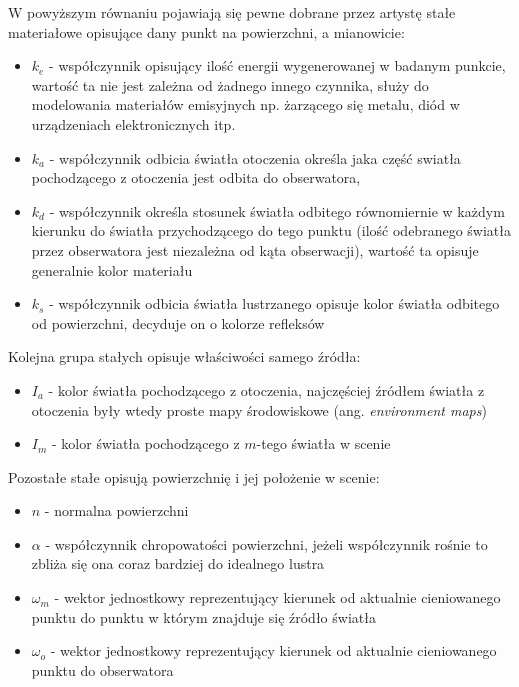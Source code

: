 \documentclass[../main.tex]{subfiles}
\begin{document}
W powyższym równaniu pojawiają się pewne dobrane przez artystę stałe materiałowe opisujące dany punkt na powierzchni, a mianowicie:

\begin{itemize}

\item $k_e$ - współczynnik opisujący ilość energii wygenerowanej w badanym punkcie, wartość ta nie jest zależna od żadnego innego czynnika, służy do modelowania materiałów emisyjnych np. żarzącego się metalu, diód w urządzeniach elektronicznych itp.

\item $k_a$ - współczynnik odbicia światła otoczenia określa jaka część swiatła pochodzącego z otoczenia jest odbita do obserwatora, 

\item $k_d$ - współczynnik określa stosunek światła odbitego równomiernie w każdym kierunku do światła przychodzącego do tego punktu (ilość odebranego światła przez obserwatora jest niezależna od kąta obserwacji), wartość ta opisuje generalnie kolor materiału

\item $k_s$ - współczynnik odbicia światła lustrzanego opisuje kolor światła odbitego od powierzchni, decyduje on o kolorze refleksów

\end{itemize}

\noindent Kolejna grupa stałych opisuje właściwości samego źródła:

\begin{itemize}
    \item $I_a$ - kolor światła pochodzącego z otoczenia, najczęściej źródłem światła z otoczenia były wtedy proste mapy środowiskowe (ang. \textit{environment maps}) 
    \item $I_m$ - kolor światła pochodzącego z $m$-tego światła w scenie
\end{itemize}

\noindent Pozostałe stałe opisują powierzchnię i jej położenie w scenie:

\begin{itemize}
    \item $n$ - normalna powierzchni
    \item $\alpha$ - współczynnik chropowatości powierzchni, jeżeli współczynnik rośnie to zbliża się ona coraz bardziej do idealnego lustra
    \item $\omega_m$ - wektor jednostkowy reprezentujący kierunek od aktualnie cieniowanego punktu do punktu w którym znajduje się źródło światła
    \item $\omega_o$ - wektor jednostkowy reprezentujący kierunek od aktualnie cieniowanego punktu do obserwatora
\end{itemize}
\end{document}
